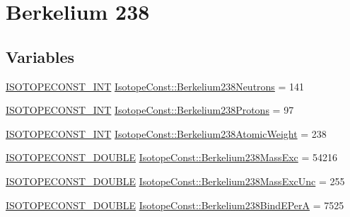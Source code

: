 \hypertarget{group___isotope_const-_berkelium-_bk238}{}\section{Berkelium 238}
\label{group___isotope_const-_berkelium-_bk238}
\subsection*{Variables}
\begin{DoxyCompactItemize}
\item 
\mbox{\hyperlink{group___isotope_const-_macros_ga5f18360b3e99483a35c32d789e62621c}{I\+S\+O\+T\+O\+P\+E\+C\+O\+N\+S\+T\+\_\+\+I\+NT}} \mbox{\hyperlink{group___isotope_const-_berkelium-_bk238_ga248c7aa7649aa6337e2cc0648aa3db4a}{Isotope\+Const\+::\+Berkelium238\+Neutrons}} = 141
\item 
\mbox{\hyperlink{group___isotope_const-_macros_ga5f18360b3e99483a35c32d789e62621c}{I\+S\+O\+T\+O\+P\+E\+C\+O\+N\+S\+T\+\_\+\+I\+NT}} \mbox{\hyperlink{group___isotope_const-_berkelium-_bk238_ga74f53a4442ee857e8477efc0119db055}{Isotope\+Const\+::\+Berkelium238\+Protons}} = 97
\item 
\mbox{\hyperlink{group___isotope_const-_macros_ga5f18360b3e99483a35c32d789e62621c}{I\+S\+O\+T\+O\+P\+E\+C\+O\+N\+S\+T\+\_\+\+I\+NT}} \mbox{\hyperlink{group___isotope_const-_berkelium-_bk238_ga582a7539d821139f55c590b0110b5d8a}{Isotope\+Const\+::\+Berkelium238\+Atomic\+Weight}} = 238
\item 
\mbox{\hyperlink{group___isotope_const-_macros_ga8f45a7272ce02c0b4c65c44636ed719a}{I\+S\+O\+T\+O\+P\+E\+C\+O\+N\+S\+T\+\_\+\+D\+O\+U\+B\+LE}} \mbox{\hyperlink{group___isotope_const-_berkelium-_bk238_ga0c614a1d23ffaeb1dd0d6447fecc0001}{Isotope\+Const\+::\+Berkelium238\+Mass\+Exc}} = 54216
\item 
\mbox{\hyperlink{group___isotope_const-_macros_ga8f45a7272ce02c0b4c65c44636ed719a}{I\+S\+O\+T\+O\+P\+E\+C\+O\+N\+S\+T\+\_\+\+D\+O\+U\+B\+LE}} \mbox{\hyperlink{group___isotope_const-_berkelium-_bk238_gadeb505b2f3cbf1a01cd93b0c22da81b4}{Isotope\+Const\+::\+Berkelium238\+Mass\+Exc\+Unc}} = 255
\item 
\mbox{\hyperlink{group___isotope_const-_macros_ga8f45a7272ce02c0b4c65c44636ed719a}{I\+S\+O\+T\+O\+P\+E\+C\+O\+N\+S\+T\+\_\+\+D\+O\+U\+B\+LE}} \mbox{\hyperlink{group___isotope_const-_berkelium-_bk238_gaf0b179b74a7260e37af932611b695c36}{Isotope\+Const\+::\+Berkelium238\+Bind\+E\+PerA}} = 7525
\item 

\end{DoxyCompactItemize}
